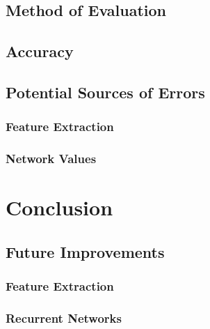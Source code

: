 \documentclass[12pt]{article}
\begin{document}
\subsection{Method of Evaluation}

\subsection{Accuracy}

\subsection{Potential Sources of Errors}

\subsubsection{Feature Extraction}

\subsubsection{Network Values}

\section{Conclusion}

\subsection{Future Improvements}

\subsubsection{Feature Extraction}

\subsubsection{Recurrent Networks}


\newpage


\end{document}
